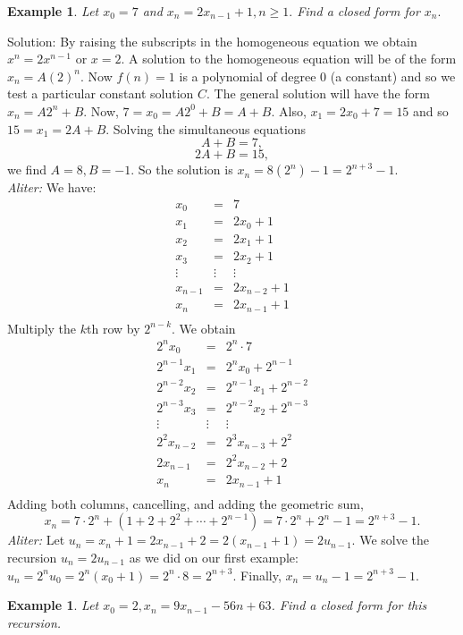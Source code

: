 \documentclass[11pt, openany]{book}
\theoremstyle{change} \theoremheaderfont{\blue\sffamily\bfseries}
\newtheorem{exa}[thm]{Example}
\theoremstyle{nonumberplain} \theoremheaderfont{\sffamily\bfseries}
\newcommand{\í}{\'{\i}}
\begin{document}
\begin{exa} Let $x_0 = 7$ and $x_n = 2x_{n - 1} + 1, n \geq 1.$ Find a closed form for $x_n.$  \end{exa}
Solution: By raising the subscripts in the homogeneous equation
we obtain $x^n = 2x^{n - 1}$ or $x = 2$. A solution to the
homogeneous equation will be of the form $x_n = A(2)^n$. Now $f(n)
= 1$ is a polynomial of degree 0 (a constant) and so we test a
particular constant solution $C$. The general solution will have
the form $x_n = A2^n + B$. Now, $7 = x_0 = A2^0 + B = A + B$.
Also, $x_1 = 2x_0 + 7 = 15$ and so $15 = x_1 = 2A + B$. Solving
the simultaneous equations
$$A + B = 7,$$
$$2A + B = 15,$$we find $A = 8, B = -1.$ So the solution is $x_n = 8(2^n) - 1 = 2^{n + 3} - 1.$ \\
{\em Aliter:} We have:
$$
\begin{array}{lcl}
x_0 & = & 7 \\
x_1 & = & 2x_0  + 1\\
x_2 & = & 2x_1  + 1\\
x_3 & = & 2x_2  + 1\\
\vdots & \vdots & \vdots \\
x_{n - 1} & = & 2x_{n - 2} + 1 \\
x_n & = & 2x_{n-1} + 1\\
\end{array}
$$
Multiply the  $k$th row by $2^{n - k}$. We  obtain
$$
\begin{array}{lcl}
2^nx_0 & = & 2^n\cdot 7 \\
2^{n - 1}x_1 & = & 2^nx_0  + 2^{n - 1}\\
2^{n - 2}x_2 & = & 2^{n - 1}x_1  + 2^{n - 2}\\
2^{n - 3}x_3 & = & 2^{n - 2}x_2  + 2^{n - 3}\\
\vdots & \vdots & \vdots \\
2^2x_{n - 2} & = & 2^3x_{n - 3} + 2^2 \\
2x_{n - 1} & = & 2^2x_{n - 2} + 2 \\
x_n & = & 2x_{n-1} + 1\\
\end{array}
$$Adding both columns, cancelling, and adding the geometric sum,
$$x_n = 7\cdot 2^n + (1 + 2 + 2^2 + \cdots + 2^{n - 1}) = 7\cdot 2^n + 2^n - 1 = 2^{n + 3} - 1.$$
{\em Aliter:} Let $u_n = x_n + 1 = 2x_{n - 1} + 2 = 2(x_{n - 1} +
1) = 2u_{n - 1}.$  We solve the recursion $u_n = 2u_{n - 1}$ as we
did on our first example: $u_n = 2^nu_0 = 2^n(x_0 + 1) = 2^n\cdot
8 = 2^{n + 3}. $ Finally, $x_n = u_n - 1 = 2^{n + 3} - 1.$
\begin{exa}
Let $x_0 = 2, x_n = 9x_{n - 1} - 56n + 63$. Find a closed form for
this recursion.
\end{exa}
\end{document}
